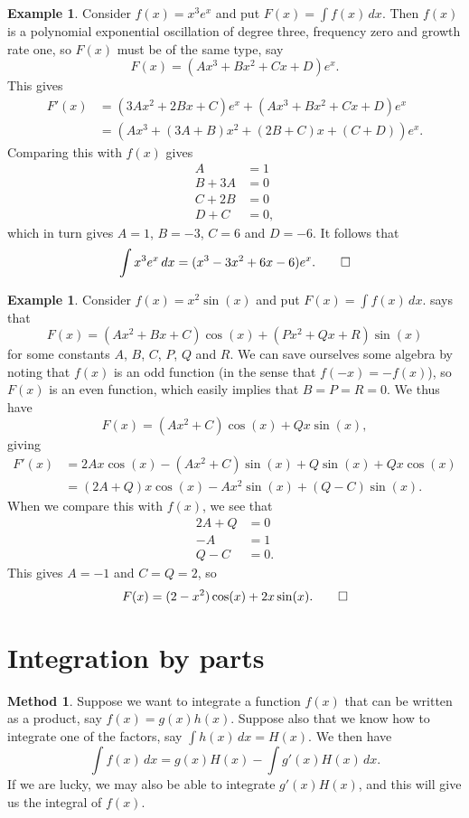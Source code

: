 \documentclass[a4paper]{book}
\theoremstyle{definition}
\newtheorem{example}[theorem]{Example}
\newtheorem{method}[theorem]{Method}
\begin{document}
\begin{example}
 Consider $f(x)=x^3e^x$ and put $F(x)=\int f(x)\,dx$.  Then $f(x)$ is
 a polynomial exponential oscillation of degree three, frequency zero
 and growth rate one, so $F(x)$ must be of the same type, say
 \[ F(x) = (Ax^3 + Bx^2 + Cx + D)e^x. \]
 This gives
 \begin{align*}
  F'(x) &= (3Ax^2+2Bx+C)e^x + (Ax^3+Bx^2+Cx+D)e^x \\
        &= (Ax^3 + (3A+B)x^2 + (2B+C)x + (C+D))e^x. 
 \end{align*}
 Comparing this with $f(x)$ gives
 \begin{align*}
  A &= 1 \\
  B + 3A &= 0 \\
  C + 2B &= 0 \\
  D + C  &= 0,
 \end{align*}
 which in turn gives $A=1$, $B=-3$, $C=6$ and $D=-6$.  It follows that 
 \[ \int x^3 e^x\, dx = (x^3-3x^2+6x-6)e^x. \qed \]
\end{example}
\begin{example}
 Consider $f(x)=x^2\sin(x)$ and put $F(x)=\int f(x)\, dx$.  
  says that 
 \[ F(x) = (Ax^2+Bx+C)\cos(x) + (Px^2+Qx+R)\sin(x) \]
 for some constants $A$, $B$, $C$, $P$, $Q$ and $R$.  We can save
 ourselves some algebra by noting that $f(x)$ is an odd function (in
 the sense that $f(-x)=-f(x)$), so $F(x)$ is an even function, which
 easily implies that $B=P=R=0$.  We thus have
 \[ F(x) = (Ax^2+C)\cos(x) + Q x \sin(x), \]
 giving
 \begin{align*}
  F'(x) &= 2Ax\cos(x) - (Ax^2+C)\sin(x) + 
           Q\sin(x) + Qx\cos(x) \\
        &= (2A+Q)x\cos(x) - Ax^2\sin(x) + (Q-C)\sin(x).
 \end{align*}
 When we compare this with $f(x)$, we see that
 \begin{align*}
  2A+Q &= 0 \\
  -A &= 1 \\
  Q-C &= 0.
 \end{align*}
 This gives $A=-1$ and $C=Q=2$, so 
 \[ F(x)=(2-x^2)\cos(x)+2x\sin(x). \qed \]
\end{example}

\section{Integration by parts}
\label{sec-int-parts}

\begin{method}
 Suppose we want to integrate a function $f(x)$ that can be written as
 a product, say $f(x)=g(x)h(x)$.  Suppose also that we know how to
 integrate one of the factors, say $\int h(x)\,dx=H(x)$.  We then have
 \[ \int f(x)\, dx = g(x)H(x) - \int g'(x)H(x)\, dx. \]
 If we are lucky, we may also be able to integrate $g'(x)H(x)$, and
 this will give us the integral of $f(x)$.  
\end{method}
\end{document}
